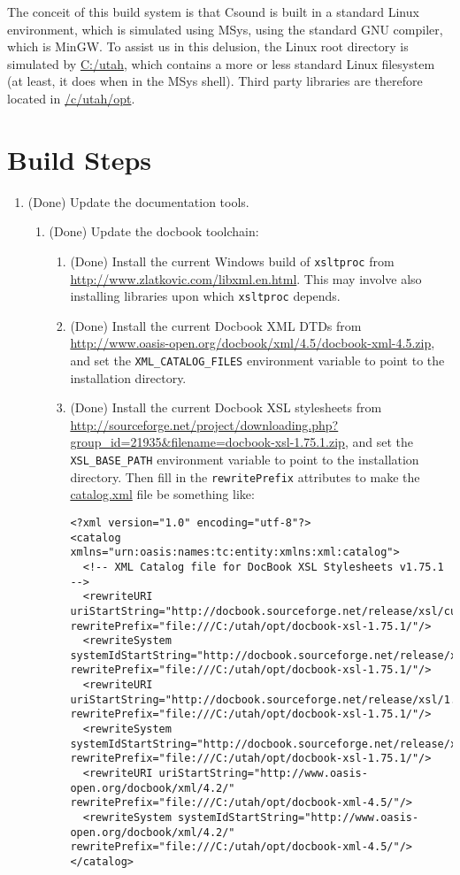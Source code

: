 \documentclass[11pt,letterpaper,onecolumn]{scrartcl}
\begin{document}
\begin{sloppypar}
The conceit of this build system is that Csound is built in a standard Linux environment, which is simulated using MSys, using the standard GNU compiler, which is MinGW. To assist us in this delusion, the Linux root directory is simulated by \url{C:/utah}, which contains a more or less standard Linux filesystem (at least, it does when in the MSys shell). Third party libraries are therefore located in \url{/c/utah/opt}.

\section{Build Steps}
\label{sec:BuildSteps}

\begin{enumerate}
	\item (Done) Update the documentation tools.
		\begin{enumerate}
	    \item (Done) Update the docbook toolchain:
				\begin{enumerate}
					\item (Done) Install the current Windows build of \texttt{xsltproc} from \url{http://www.zlatkovic.com/libxml.en.html}. This may involve also installing libraries upon which \texttt{xsltproc} depends.
					\item (Done) Install the current Docbook XML DTDs from \url{http://www.oasis-open.org/docbook/xml/4.5/docbook-xml-4.5.zip}, and set the \verb|XML_CATALOG_FILES| environment variable to point to the installation directory.
					\item (Done) Install the current Docbook XSL stylesheets from \url{http://sourceforge.net/project/downloading.php?group_id=21935&filename=docbook-xsl-1.75.1.zip}, and set the \verb|XSL_BASE_PATH| environment variable to point to the installation directory. Then fill in the \texttt{rewritePrefix} attributes to make the \url{catalog.xml} file be something like:
					\begin{lstlisting}
<?xml version="1.0" encoding="utf-8"?>
<catalog xmlns="urn:oasis:names:tc:entity:xmlns:xml:catalog">
  <!-- XML Catalog file for DocBook XSL Stylesheets v1.75.1 -->
  <rewriteURI uriStartString="http://docbook.sourceforge.net/release/xsl/current/" rewritePrefix="file:///C:/utah/opt/docbook-xsl-1.75.1/"/>
  <rewriteSystem systemIdStartString="http://docbook.sourceforge.net/release/xsl/current/" rewritePrefix="file:///C:/utah/opt/docbook-xsl-1.75.1/"/>
  <rewriteURI uriStartString="http://docbook.sourceforge.net/release/xsl/1.75.1/" rewritePrefix="file:///C:/utah/opt/docbook-xsl-1.75.1/"/>
  <rewriteSystem systemIdStartString="http://docbook.sourceforge.net/release/xsl/1.75.1/" rewritePrefix="file:///C:/utah/opt/docbook-xsl-1.75.1/"/>
  <rewriteURI uriStartString="http://www.oasis-open.org/docbook/xml/4.2/" rewritePrefix="file:///C:/utah/opt/docbook-xml-4.5/"/>
  <rewriteSystem systemIdStartString="http://www.oasis-open.org/docbook/xml/4.2/" rewritePrefix="file:///C:/utah/opt/docbook-xml-4.5/"/>
</catalog>
					\end{lstlisting}
				\end{enumerate}


\end{enumerate}
\end{enumerate}
\end{sloppypar}
\end{document}
